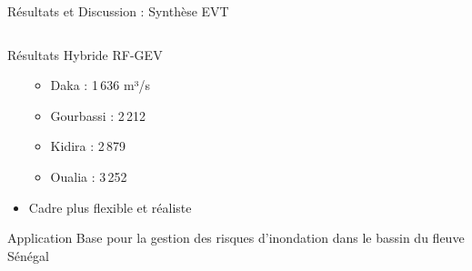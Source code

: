 \documentclass[aspectratio=169, 9pt]{beamer}
\begin{document}
\begin{frame}{Résultats et Discussion : Synthèse EVT}
\begin{columns}[T]
\begin{column}{0.48\textwidth}
\begin{alertblock}{Résultats Hybride RF-GEV}
\begin{itemize}
\begin{itemize}
              \item Daka : 1\,636 m³/s
              \item Gourbassi : 2\,212
              \item Kidira : 2\,879
              \item Oualia : 3\,252
            \end{itemize}
      \item Cadre plus flexible et réaliste
    \end{itemize}
  \end{alertblock}
  \vspace{0.1cm}
  \begin{block}{Application}
  \small
    Base pour la gestion des risques
    d'inondation dans le bassin du
    fleuve Sénégal
  \end{block}
\end{column}
\end{columns}
\end{frame}
\end{document}
